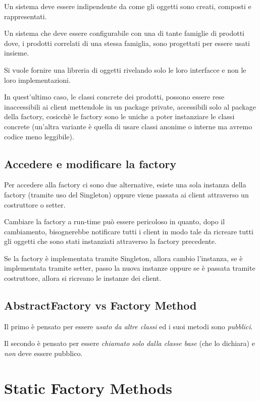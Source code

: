 Un sistema deve essere indipendente da come gli oggetti sono creati, composti e rappresentati.

Un sistema che deve essere configurabile con una di tante famiglie di prodotti dove, i prodotti correlati di una stessa famiglia, sono progettati per essere usati 
insieme.

Si vuole fornire una libreria di oggetti rivelando solo le loro interfacce e non le loro implementazioni.

In quest'ultimo caso, le classi concrete dei prodotti, possono essere rese inaccessibili ai client mettendole in un package private, accessibili solo al package della
factory, cosicchè le factory sono le uniche a poter instanziare le classi concrete (un'altra variante è quella di usare classi anonime o interne ma avremo codice meno
leggibile).

\subsection{Accedere e modificare la factory}

Per accedere alla factory ci sono due alternative, esiste una sola instanza della factory (tramite uso del Singleton) oppure viene passata ai client attraverso un 
costruttore o setter.

Cambiare la factory a run-time può essere pericoloso in quanto, dopo il cambiamento, bisognerebbe notificare tutti i client in modo tale da ricreare tutti gli oggetti 
che sono stati instanziati attraverso la factory precedente.

Se la factory è implementata tramite Singleton, allora cambio l'instanza, se è implementata tramite setter, passo la nuova instanze oppure se è passata tramite 
costruttore, allora si ricreano le instanze dei client.

\subsection{AbstractFactory vs Factory Method}

Il primo è pensato per essere \textit{usato da altre classi} ed i suoi metodi sono \textit{pubblici}.

Il secondo è pensato per essere \textit{chiamato solo dalla classe base} (che lo dichiara) e \textit{non} deve essere pubblico.

\section{Static Factory Methods}

